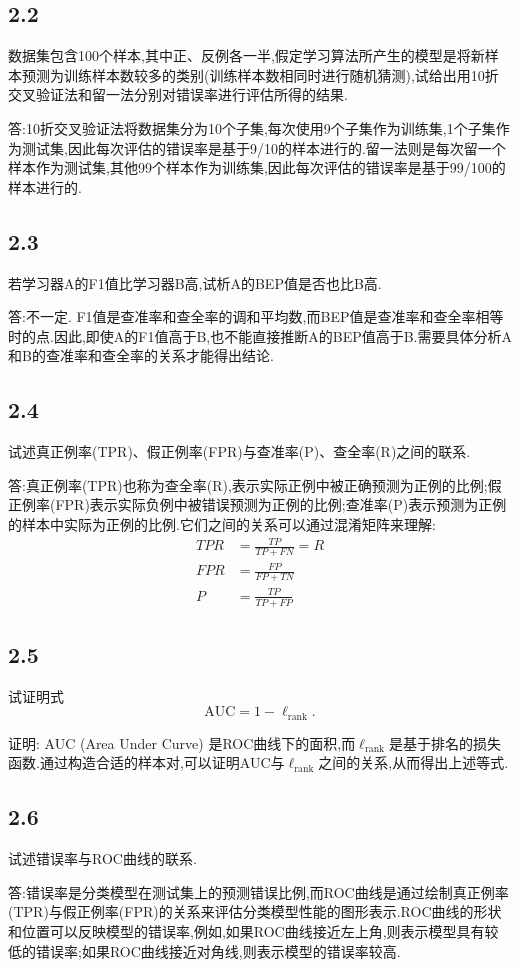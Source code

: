 \subsection*{2.2}
数据集包含100个样本,其中正、反例各一半,假定学习算法所产生的模型是将新样本预测为训练样本数较多的类别(训练样本数相同时进行随机猜测),试给出用10折交叉验证法和留一法分别对错误率进行评估所得的结果.

\par 答:10折交叉验证法将数据集分为10个子集,每次使用9个子集作为训练集,1个子集作为测试集,因此每次评估的错误率是基于9/10的样本进行的.留一法则是每次留一个样本作为测试集,其他99个样本作为训练集,因此每次评估的错误率是基于99/100的样本进行的.
\subsection*{2.3}
若学习器A的F1值比学习器B高,试析A的BEP值是否也比B高.
\par 答:不一定. F1值是查准率和查全率的调和平均数,而BEP值是查准率和查全率相等时的点.因此,即使A的F1值高于B,也不能直接推断A的BEP值高于B.需要具体分析A和B的查准率和查全率的关系才能得出结论.
\subsection*{2.4}
试述真正例率(TPR)、假正例率(FPR)与查准率(P)、查全率(R)之间的联系.
\par 答:真正例率(TPR)也称为查全率(R),表示实际正例中被正确预测为正例的比例;假正例率(FPR)表示实际负例中被错误预测为正例的比例;查准率(P)表示预测为正例的样本中实际为正例的比例.它们之间的关系可以通过混淆矩阵来理解:
\begin{align*}
    TPR &= \frac{TP}{TP + FN} = R \\
    FPR &= \frac{FP}{FP + TN} \\
    P &= \frac{TP}{TP + FP}
\end{align*}
\subsection*{2.5}
试证明式\begin{equation}
    \text{AUC} = 1 - \ell_{\text{rank}}.
\end{equation}
\par   证明: AUC (Area Under Curve) 是ROC曲线下的面积,而$\ell_{\text{rank}}$是基于排名的损失函数.通过构造合适的样本对,可以证明AUC与$\ell_{\text{rank}}$之间的关系,从而得出上述等式.
\subsection*{2.6}
试述错误率与ROC曲线的联系.
\par 答:错误率是分类模型在测试集上的预测错误比例,而ROC曲线是通过绘制真正例率(TPR)与假正例率(FPR)的关系来评估分类模型性能的图形表示.ROC曲线的形状和位置可以反映模型的错误率,例如,如果ROC曲线接近左上角,则表示模型具有较低的错误率;如果ROC曲线接近对角线,则表示模型的错误率较高.

